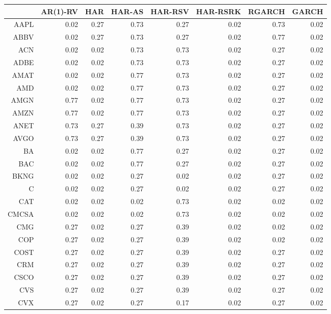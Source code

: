 \begin{table}[ht]
\centering
\begin{tabular}{rrrrrrrr}
  \hline
 & AR(1)-RV & HAR & HAR-AS & HAR-RSV & HAR-RSRK & RGARCH & GARCH \\ 
  \hline
AAPL & 0.02 & 0.27 & 0.73 & 0.27 & 0.02 & 0.73 & 0.02 \\ 
  ABBV & 0.02 & 0.27 & 0.73 & 0.27 & 0.02 & 0.77 & 0.02 \\ 
  ACN & 0.02 & 0.02 & 0.73 & 0.73 & 0.02 & 0.27 & 0.02 \\ 
  ADBE & 0.02 & 0.02 & 0.73 & 0.73 & 0.02 & 0.27 & 0.02 \\ 
  AMAT & 0.02 & 0.02 & 0.77 & 0.73 & 0.02 & 0.27 & 0.02 \\ 
  AMD & 0.02 & 0.02 & 0.77 & 0.73 & 0.02 & 0.27 & 0.02 \\ 
  AMGN & 0.77 & 0.02 & 0.77 & 0.73 & 0.02 & 0.27 & 0.02 \\ 
  AMZN & 0.77 & 0.02 & 0.77 & 0.73 & 0.02 & 0.27 & 0.02 \\ 
  ANET & 0.73 & 0.27 & 0.39 & 0.73 & 0.02 & 0.27 & 0.02 \\ 
  AVGO & 0.73 & 0.27 & 0.39 & 0.73 & 0.02 & 0.27 & 0.02 \\ 
  BA & 0.02 & 0.02 & 0.77 & 0.27 & 0.02 & 0.27 & 0.02 \\ 
  BAC & 0.02 & 0.02 & 0.77 & 0.27 & 0.02 & 0.27 & 0.02 \\ 
  BKNG & 0.02 & 0.02 & 0.27 & 0.02 & 0.02 & 0.27 & 0.02 \\ 
  C & 0.02 & 0.02 & 0.27 & 0.02 & 0.02 & 0.27 & 0.02 \\ 
  CAT & 0.02 & 0.02 & 0.02 & 0.73 & 0.02 & 0.02 & 0.02 \\ 
  CMCSA & 0.02 & 0.02 & 0.02 & 0.73 & 0.02 & 0.02 & 0.02 \\ 
  CMG & 0.27 & 0.02 & 0.27 & 0.39 & 0.02 & 0.02 & 0.02 \\ 
  COP & 0.27 & 0.02 & 0.27 & 0.39 & 0.02 & 0.02 & 0.02 \\ 
  COST & 0.27 & 0.02 & 0.27 & 0.39 & 0.02 & 0.27 & 0.02 \\ 
  CRM & 0.27 & 0.02 & 0.27 & 0.39 & 0.02 & 0.27 & 0.02 \\ 
  CSCO & 0.27 & 0.02 & 0.27 & 0.39 & 0.02 & 0.27 & 0.02 \\ 
  CVS & 0.27 & 0.02 & 0.27 & 0.39 & 0.02 & 0.27 & 0.02 \\ 
  CVX & 0.27 & 0.02 & 0.27 & 0.17 & 0.02 & 0.27 & 0.02 \\ 

\end{tabular}
\end{table}
